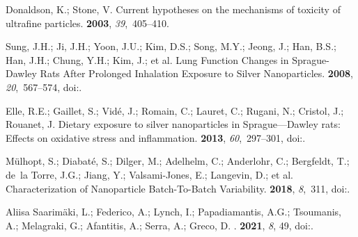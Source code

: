 \documentclass[ijms,article,accept,moreauthors,pdftex]{Definitions/mdpi}
\begin{document}
\begin{thebibliography}{999}
Donaldson, K.; Stone, V.
\newblock Current hypotheses on the mechanisms of toxicity of ultrafine
  particles.
 {\bf 2003}, {\em
  39},~405--410.

Sung, J.H.; Ji, J.H.; Yoon, J.U.; Kim, D.S.; Song, M.Y.; Jeong, J.; Han, B.S.; Han, J.H.; Chung, Y.H.; Kim, J.; et al.
\newblock Lung Function Changes in Sprague-Dawley Rats After Prolonged
  Inhalation Exposure to Silver Nanoparticles.
 {\bf 2008}, {\em 20},~567--574,
\newblock
  doi:{\href{https://doi.org/10.1080/08958370701874671}{}}.

Elle, R.E.; Gaillet, S.; Vid{\'{e}}, J.; Romain, C.; Lauret, C.; Rugani, N.;
  Cristol, J.; Rouanet, J.
\newblock Dietary exposure to silver nanoparticles in
  Sprague---Dawley rats: Effects on oxidative stress and
  inflammation.
 {\bf 2013}, {\em 60},~297--301,
\newblock
  doi:{\href{https://doi.org/10.1016/j.fct.2013.07.071}{}}.

M\"{u}lhopt, S.; Diabat{\'{e}}, S.; Dilger, M.; Adelhelm, C.; Anderlohr, C.;
  Bergfeldt, T.; de~la Torre, J.G.; Jiang, Y.; Valsami-Jones, E.; Langevin, D.;
  et al.
\newblock Characterization of Nanoparticle Batch-To-Batch Variability.
 {\bf 2018}, {\em 8},~311,
\newblock
  doi:{\href{https://doi.org/10.3390/nano8050311}{}}.

{Aliisa Saarim{\"{a}}ki}, L.; Federico, A.; Lynch, I.; Papadiamantis, A.G.;
  Tsoumanis, A.; Melagraki, G.; Afantitis, A.; Serra, A.; Greco, D.
.
 {\bf 2021}, {\em 8}, 49, 
\newblock
  doi:{\href{https://doi.org/10.1038/s41597-021-00808-y}{}}.


\end{thebibliography}
\end{document}
